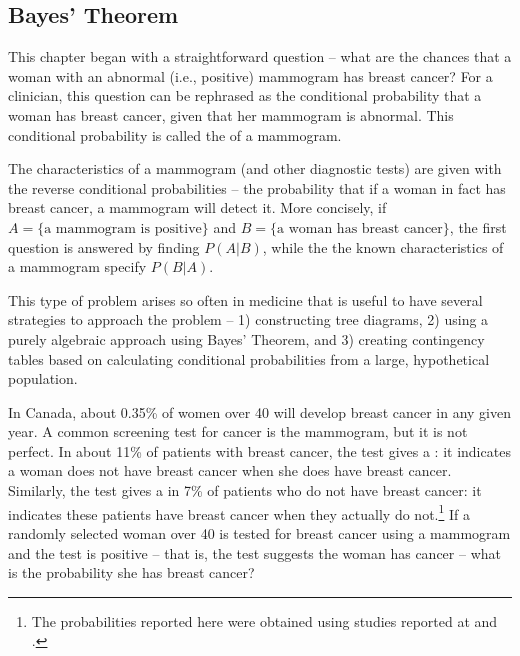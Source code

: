 \subsection{Bayes' Theorem}
\label{bayesTheoremSubsection}


This chapter began with a straightforward question -- what are the chances that a woman with an abnormal (i.e., positive) mammogram has breast cancer?  For a clinician, this question can be rephrased as the conditional probability  that a woman has breast cancer, given that her mammogram is abnormal. This conditional probability is called the  of a mammogram.  

The characteristics of a mammogram (and other diagnostic tests) are given with the reverse conditional probabilities --  the probability that if a woman in fact has breast cancer, a mammogram will detect it.  More concisely, if $A = \text{\{a mammogram is  positive\}}$ and $B = \text{\{a woman has breast cancer\}}$, the first question is answered by finding $P(A|B)$, while the the known characteristics of a mammogram specify $P(B|A)$.

This type of problem arises so often in medicine that is useful to have several strategies to approach the problem -- 1) constructing tree diagrams, 2) using a purely algebraic approach using Bayes' Theorem, and 3) creating contingency tables based on calculating conditional probabilities from a large, hypothetical population.

\begin{example}{In Canada, about 0.35\% of women over 40 will develop breast cancer in any given year. A common screening test for cancer is the mammogram, but it is not perfect. In about 11\% of patients with breast cancer, the test gives a : it indicates a woman does not have breast cancer when she does have breast cancer. Similarly, the test gives a  in 7\% of patients who do not have breast cancer: it indicates these patients have breast cancer when they actually do not.\footnote{The probabilities reported here were obtained using studies reported at  and .} If a randomly selected woman over 40 is tested for breast cancer using a mammogram and the test is positive -- that is, the test suggests the woman has cancer -- what is the probability she has breast cancer?}
\label{probabilityOfBreastCancerGivenPositiveTestExample}
\end{example}

